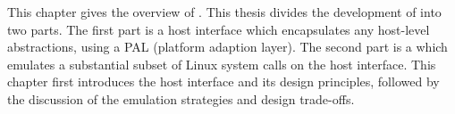 This chapter gives the overview of \graphene{}.
This thesis divides
the development of \graphene{} into two parts.
The first part is a host interface which encapsulates any host-level abstractions,
using a PAL (platform adaption layer). %
The second part is a \libos{} which emulates a substantial subset of Linux system calls on the host interface.
This chapter first introduces the host interface and its design principles,
followed by the discussion of the \libos{}
emulation strategies %
and design trade-offs.


